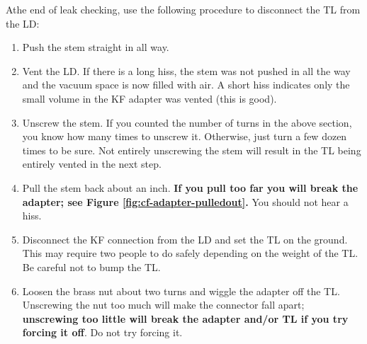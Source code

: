 Athe end of leak checking, use the following procedure to disconnect the TL from the LD:

\begin{enumerate}
 \item Push the stem straight in all way.
 \item Vent the LD.  If there is a long hiss, the stem was not pushed in all the way and the vacuum space is now filled with air.  A short hiss indicates only the small volume in the KF adapter was vented (this is good).
 \item Unscrew the stem.  If you counted the number of turns in the above section, you know how many times to unscrew it.  Otherwise, just turn a few dozen times to be sure.  Not entirely unscrewing the stem will result in the TL being entirely vented in the next step.
 \item Pull the stem back about an inch.  \textbf{If you pull too far you will break the adapter; see Figure \ref{fig:cf-adapter-pulledout}.}  You should not hear a hiss.
 \item Disconnect the KF connection from the LD and set the TL on the ground.  This may require two people to do safely depending on the weight of the TL.  Be careful not to bump the TL.
 \item Loosen the brass nut about two turns and wiggle the adapter off the TL.  Unscrewing the nut too much will make the connector fall apart; \textbf{unscrewing too little will break the adapter and/or TL if you try forcing it off}.  Do not try forcing it.
\end{enumerate}


